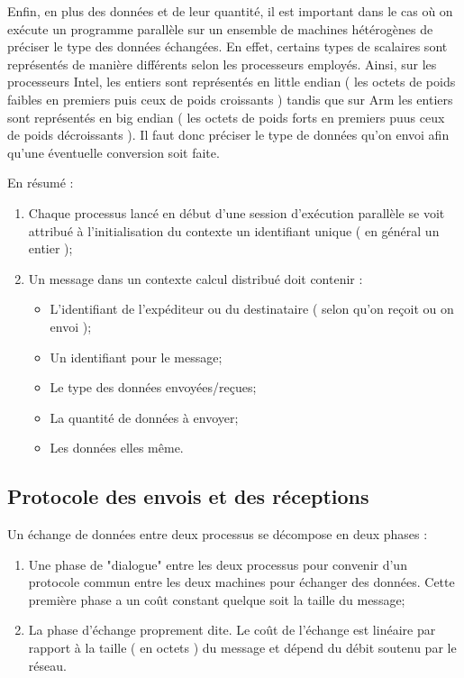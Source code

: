 \documentclass[fleqn,11pt]{article}
\begin{document}
Enfin, en plus des données et de leur quantité, il est important dans le cas où
on exécute un programme parallèle sur un ensemble de machines hétérogènes
de préciser le type des données échangées. En effet, certains types de scalaires
sont représentés de manière différents selon les processeurs employés. Ainsi,
sur les processeurs Intel, les entiers sont représentés en little endian ( les octets
de poids faibles en premiers puis ceux de poids croissants ) tandis que sur Arm
les entiers sont représentés en big endian ( les octets de poids forts en premiers
puus ceux de poids décroissants ). Il faut donc préciser le type de données qu'on
envoi afin qu'une éventuelle conversion soit faite.

En résumé :
\begin{enumerate}
\item Chaque processus lancé en début d'une session d'exécution parallèle se voit
attribué à l'initialisation du contexte un identifiant unique ( en général un entier );
\item Un message dans un contexte calcul distribué doit contenir : 
\begin{itemize}
\item L'identifiant de l'expéditeur ou du destinataire ( selon qu'on reçoit ou on
envoi );
\item Un identifiant pour le message;
\item Le type des données envoyées/reçues;
\item La quantité de données à envoyer;
\item Les données elles même.
\end{itemize}
\end{enumerate}

\subsection{Protocole des envois et des réceptions}

Un échange de données entre deux processus se décompose en deux phases :
\begin{enumerate}
\item Une phase de "dialogue" entre les deux processus pour convenir d'un
protocole commun entre les deux machines pour échanger des données. Cette
première phase a un coût constant quelque soit la taille du message;
\item La phase d'échange proprement dite. Le coût de l'échange est linéaire
par rapport à la taille ( en octets ) du message et dépend du débit
soutenu par le réseau.
\end{enumerate}
\end{document}
